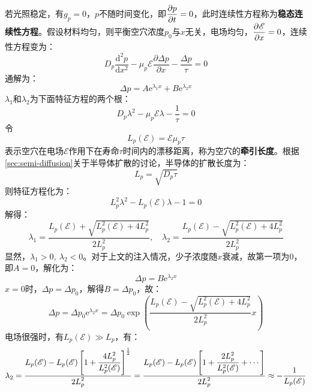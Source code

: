 若光照稳定，有$g_p=0$，$p$不随时间变化，即$\displaystyle\frac{\partial p}{\partial t}=0$，此时连续性方程称为\textbf{稳态连续性方程}。假设材料均匀，则平衡空穴浓度$p_0$与$x$无关，电场均匀，$\displaystyle \frac{\partial \mathscr{E}}{\partial x}=0$，连续性方程变为：
\begin{equation}
    D_p\frac{\mathrm{d}^2p}{\mathrm{d}x^2}-\mu_p\mathscr{E}\frac{\partial \Delta p}{\partial x}-\frac{\Delta p}{\tau}=0
\end{equation}
通解为：
\begin{equation}
    \Delta p=A\mathrm{e}^{\lambda_1x}+B\mathrm{e}^{\lambda_2x}
\end{equation}
$\lambda_1$和$\lambda_2$为下面特征方程的两个根：
\begin{equation}
    D_p\lambda^2-\mu_p\mathscr{E}\lambda-\frac{1}{\tau}=0
\end{equation}
令
\begin{equation}
    L_p(\mathscr{E})=\mathscr{E}\mu_p\tau
\end{equation}
表示空穴在电场$\mathscr{E}$作用下在寿命$\tau$时间内的漂移距离，称为空穴的\textbf{牵引长度}。根据 \autoref{sec:semi-diffusion}关于半导体扩散的讨论，半导体的扩散长度为：
\begin{equation}
    L_p=\sqrt{D_p\tau}
\end{equation}
则特征方程化为：
\begin{equation}
    L_p^2\lambda^2-L_p(\mathscr{E})\lambda-1=0
\end{equation}
解得：
\begin{equation}
    \lambda_1=\frac{L_p(\mathscr{E})+\sqrt{L_p^2(\mathscr{E})+4L_p^2}}{2L_p^2},\quad \lambda_2=\frac{L_p(\mathscr{E})-\sqrt{L_p^2(\mathscr{E})+4L_p^2}}{2L_p^2}
\end{equation}
显然，$\lambda_1>0,\ \lambda_2<0$。对于上文的注入情况，少子浓度随$x$衰减，故第一项为$0$，即$A=0$，解化为：
\begin{equation}
    \Delta p=B\mathrm{e}^{\lambda_2x}
\end{equation}
$x=0$时，$\Delta p=\Delta p_0$，解得$B=\Delta p_0$，故：
\begin{equation}
    \Delta p=\Delta p_0\mathrm{e}^{\lambda_2x}=\Delta p_0\exp{\left(\frac{L_p(\mathscr{E})-\sqrt{L_p^2(\mathscr{E})+4L_p^2}}{2L_p^2}x\right)}
\end{equation}
电场很强时，有$L_p(\mathscr{E})\gg L_p$，有：
\begin{equation}
    \lambda_2=\frac{\displaystyle L_p(\mathscr{E})-L_p(\mathscr{E})\left[1+\frac{4L_p^2}{L_p^2(\mathscr{E})}\right]^\frac{1}{2}}{\displaystyle 2L_p^2}=\frac{\displaystyle L_p(\mathscr{E})-L_p(\mathscr{E})\left[1+\frac{2L_p^2}{L_p^2(\mathscr{E})}+\cdots\right]}{\displaystyle 2L_p^2}\approx -\frac{1}{L_p(\mathscr{E})}
\end{equation}
